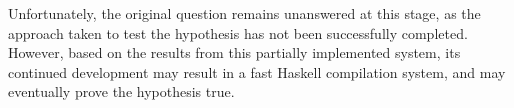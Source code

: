 Unfortunately, the original question remains unanswered at this stage, as the
approach taken to test the hypothesis has not been successfully completed. However,
based on the results from this partially implemented system, its continued
development may result in a fast Haskell compilation system, and may eventually prove
the hypothesis true.



